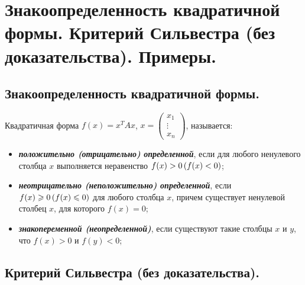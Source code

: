 \section{
    Знакоопределенность квадратичной формы. Критерий Сильвестра (без доказательства). Примеры.
}

\subsection{
    Знакоопределенность квадратичной формы.
}

\begin{definition}
    Квадратичная форма $f(x) = x^TAx$, $x = \begin{pmatrix}
        x_1 \\
        \vdots \\
        x_n
    \end{pmatrix}$, называется:

    \begin{itemize}
        \item \textbf{\textit{положительно (отрицательно) определенной}}, если для любого ненулевого столбца $x$ выполняется неравенство $f(x) > 0 \thinspace (f(x) < 0)$;
        \item \textbf{\textit{неотрицательно (неположительно) определенной}}, если $f(x) \geq 0 \thinspace (f(x) \leq 0)$ для любого столбца $x$, причем существует ненулевой столбец $x$, для которого $f(x) = 0$;
        \item \textbf{\textit{знакопеременной (неопределенной)}}, если существуют такие столбцы $x$ и $y$, что $f(x) > 0$ и $f(y) < 0$;
    \end{itemize}
\end{definition}

\subsection{
    Критерий Сильвестра (без доказательства).
}

